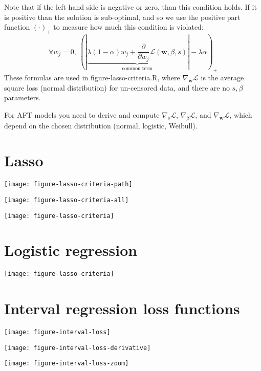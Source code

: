 \documentclass{article}
\begin{document}
Note that if the left hand side is negative or zero, than this
condition holds. If it is positive than the solution is sub-optimal,
and so we use the positive part function $(\cdot)_+$ to measure how much this
condition is violated:
\begin{equation}
  \forall w_j= 0,\ 
  (|\underbrace{\lambda(1-\alpha)w_j +
    \frac{\partial}{\partial w_j} 
  \mathcal L(\mathbf w, \beta, s)}_{\text{common term}}|
 -  \lambda\alpha)_+
\end{equation}
These formulas are used in figure-lasso-criteria.R, where
$\nabla_{\mathbf w}\mathcal L$ is the average square loss (normal
distribution) for un-censored data, and there are no $s,\beta$
parameters.

For AFT models you need to derive and compute $\nabla_{s}\mathcal L$,
$\nabla_{\beta}\mathcal L$, and $\nabla_{\mathbf w}\mathcal L$, which
depend on the chosen distribution (normal, logistic, Weibull).

\section{Lasso}

\texttt{[image: figure-lasso-criteria-path]}

\texttt{[image: figure-lasso-criteria-all]}

\texttt{[image: figure-lasso-criteria]}

\section{Logistic regression}

\texttt{[image: figure-lasso-criteria]}

\section{Interval regression loss functions}
\texttt{[image: figure-interval-loss]}

\texttt{[image: figure-interval-loss-derivative]}

\texttt{[image: figure-interval-loss-zoom]}
\end{document}
